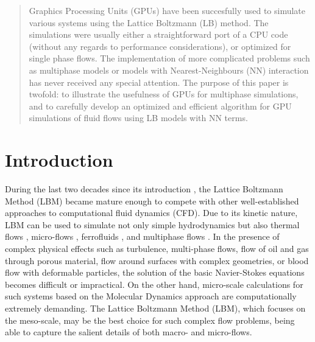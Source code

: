 \documentclass[mathpazo,sort,numbers]{cicp}
\begin{document}
\begin{abstract}
Graphics Processing Units (GPUs) have been succesfully used to simulate
various systems using the Lattice Boltzmann (LB) method.  The simulations were
usually either a straightforward port of a CPU code (without any
regards to performance considerations), or optimized for single phase
flows.  The implementation of more complicated problems such as
multiphase models or models with Nearest-Neighbours (NN) interaction
has never received any special attention.  The purpose of this paper
is twofold: to illustrate the usefulness of GPUs for multiphase simulations,
and to carefully develop an optimized and efficient algorithm for GPU
simulations of fluid flows using LB models with NN terms.
\end{abstract}



\maketitle


\section{Introduction}
\label{sec:introduction}
During the last two decades since its introduction \cite{mcnamara}, the Lattice Boltzmann Method (LBM)
became mature enough to compete with other well-established approaches to computational fluid dynamics (CFD).
Due to its kinetic nature, LBM can be used to simulate not only simple
hydrodynamics but also thermal flows \cite{karlin-minimalmodels,yuan-thermal},
micro-flows \cite{ansumali-small-knudsen}, ferrofluids \cite{rosensweig,kuzmin-aniso}, and
multiphase flows \cite{rothman-color,Shan-chen:extended,swift}. In the presence of complex
physical effects such as turbulence, multi-phase flows, flow of oil and gas through porous
material, flow around surfaces with complex geometries, or blood flow with deformable
particles, the solution of the basic Navier-Stokes equations becomes difficult or
impractical. On the other hand, micro-scale calculations for such systems based
on the Molecular Dynamics approach are computationally extremely demanding.
The Lattice Boltzmann Method (LBM), which focuses on the meso-scale, may be the best
choice for such complex flow problems, being able to capture the salient details of both macro- and micro-flows.
\end{document}
